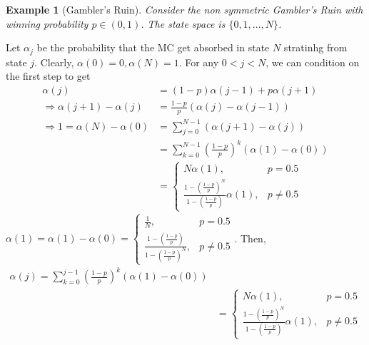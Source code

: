 \documentclass[11pt,a4paper]{article}
\newtheorem{example}{Example}
\begin{document}
\begin{example}[Gambler's Ruin]
    Consider the non symmetric Gambler's Ruin with winning probability $p\in (0,1)$. The state space is $\{0,1,...,N\}$.
\end{example}
Let $\alpha_j$ be the probability that the MC get absorbed in state $N$ stratinhg from state $j$. Clearly, $\alpha(0)=0,\alpha(N)=1$. For any $0<j<N$, we can condition on the first step to get
\begin{equation}
    \begin{aligned}
        \alpha(j)&=(1-p)\alpha(j-1)+p\alpha(j+1)\\
        \Rightarrow \alpha(j+1)-\alpha(j)&=\frac{1-p}{p}(\alpha(j)-\alpha(j-1))\\
        \Rightarrow 1=\alpha(N)-\alpha(0)&=\sum_{j=0}^{N-1}(\alpha(j+1)-\alpha(j))\\
        &=\sum_{k=0}^{N-1}\left(\frac{1-p}{p}\right)^k(\alpha(1)-\alpha(0))\\
        &=\left\{\begin{matrix}
            N\alpha(1),&p=0.5\\
            \frac{1-\left(\frac{1-p}{p}\right)^{N}}{1-\left(\frac{1-p}{p}\right)}\alpha(1),&p\neq 0.5
        \end{matrix}\right.
    \end{aligned}
    \nonumber
\end{equation}
$\alpha(1)=\alpha(1)-\alpha(0)=\left\{\begin{matrix}
    \frac{1}{N},&p=0.5\\
    \frac{1-\left(\frac{1-p}{p}\right)}{1-\left(\frac{1-p}{p}\right)^N},&p\neq 0.5
\end{matrix}\right.$. Then,
\begin{equation}
    \begin{aligned}
        \alpha(j)=\sum_{k=0}^{j-1}\left(\frac{1-p}{p}\right)^k(\alpha(1)-\alpha(0))\\
        &=\left\{\begin{matrix}
            N\alpha(1),&p=0.5\\
            \frac{1-\left(\frac{1-p}{p}\right)^{N}}{1-\left(\frac{1-p}{p}\right)}\alpha(1),&p\neq 0.5
        \end{matrix}\right.
    \end{aligned}
    \nonumber
\end{equation}
\end{document}
